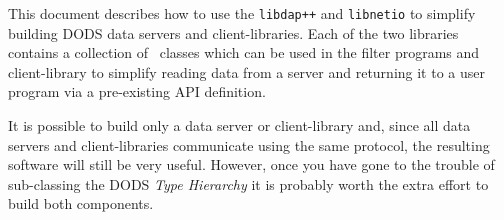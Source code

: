 This document describes how to use the {\tt libdap++} and {\tt libnetio} to
simplify building DODS data servers and client-libraries. Each of the two
libraries contains a collection of \Cpp\ classes which can be used in the
filter programs and client-library to simplify reading data from a server and
returning it to a user program via a pre-existing API definition.

It is possible to build only a data server or client-library and, since all
data servers and client-libraries communicate using the same protocol, the
resulting software will still be very useful. However, once you have gone to
the trouble of sub-classing the DODS {\em Type Hierarchy\/} it is probably
worth the extra effort to build both components.

\newpage








